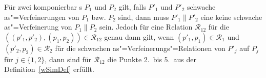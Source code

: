 \begin{Lem}
  \label{schwVerfParallelLem}
  Für zwei komponierbar \MEIO{}s $P_1$ und $P_2$ gilt, falls $P'_1$ und $P'_2$
  schwache as"=Verfeinerungen von $P_1$ bzw. $P_2$ sind, dann muss $P'_1\|P'_2$
  eine keine schwache as"=Verfeinerung von $P_1\|P_2$ sein. Jedoch für eine
  Relation $\mathcal{R}_{12}$ für die $((p'_1,p'_2),(p_1,p_2)) \in
  \mathcal{R}_{12}$ genau dann gilt, wenn $(p'_1,p_1)\in\mathcal{R}_1$ und
  $(p'_2,p_2)\in\mathcal{R}_2$ für die schwachen as"=Verfeinerungs"=Relationen
  von $P'_j$ auf $P_j$ für $j\in\{1,2\}$, dann sind für $\mathcal{R}_{12}$ die
  Punkte 2.\ bis 5.\ aus der Definition~\ref{wSimDef} erfüllt.
  \\ 
\end{Lem}
